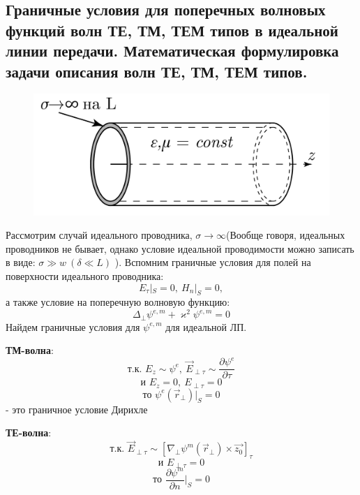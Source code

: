
\subsection{Граничные условия для поперечных волновых функций волн ТЕ, ТМ, ТЕМ типов в идеальной линии передачи. Математическая формулировка задачи описания волн ТЕ, ТМ, ТЕМ типов.}
\begin{figure}[h!]
  \centering
  \includegraphics[width = 0.6\linewidth]{img/t21.pdf}
\end{figure}
Рассмотрим случай идеального проводника, $\sigma \rightarrow \infty$(Вообще говоря, идеальных проводников не бывает,
однако условие идеальной проводимости можно записать в виде: $\sigma \gg w ~(\delta \ll L)$ ).
Вспомним граничные условия для полей на поверхности идеального проводника:
\begin{equation}
  E_{\tau}|_S = 0,~H_n|_S = 0,
\end{equation}
а также условие на поперечную волновую функцию:
\begin{equation}
  \Delta_{\perp}\psi^{e,m}+\varkappa^2\psi^{e,m}=0
\end{equation}
Найдем граничные условия для $\psi^{e,m}$ для идеальной ЛП.

\textbf{ТМ-волна}:
\begin{equation}
  \text{т.к. }E_z \sim \psi^e,~\vec{E}_{\perp \tau}\sim \frac{\partial \psi^e}{\partial \tau} 
\end{equation}
\begin{equation}
  \text{и }E_z = 0,~E_{\perp \tau} = 0 
\end{equation}
\begin{equation}
  \text{то }\psi^{e}(\vec{r}_{\perp})|_S = 0
\end{equation}
- это граничное условие Дирихле

\textbf{ТЕ-волна}:
\begin{equation}
  \text{т.к. }\vec{E}_{\perp \tau}\sim [\nabla_{\perp} \psi^m(\vec{r}_{\perp})\times\vec{z_0}]_{\tau} 
\end{equation}
\begin{equation}
  \text{и }E_{\perp \tau} = 0 
\end{equation}
\begin{equation}
  \text{то }\frac{\partial \psi^m}{\partial n}|_S = 0
\end{equation}

